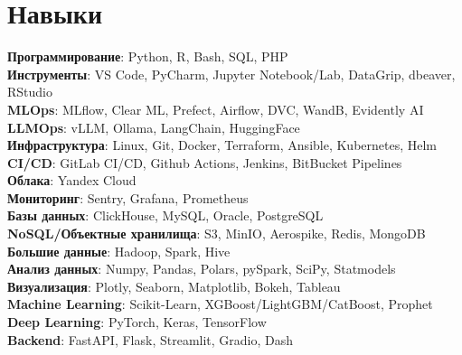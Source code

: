 \section{Навыки}
\begin{itemize}[leftmargin=0.15in, label={}]
  {\item{
        \textbf{Программирование}{: Python, R, Bash, SQL, PHP} \\
        \textbf{Инструменты}{: VS Code, PyCharm, Jupyter Notebook/Lab, DataGrip, dbeaver, RStudio} \\
        \textbf{MLOps}{: MLflow, Clear ML, Prefect, Airflow, DVC, WandB, Evidently AI} \\
        \textbf{LLMOps}{: vLLM, Ollama, LangChain, HuggingFace} \\
        \textbf{Инфраструктура}{: Linux, Git, Docker, Terraform, Ansible, Kubernetes, Helm} \\
        \textbf{CI/CD}{: GitLab CI/CD, Github Actions, Jenkins, BitBucket Pipelines} \\
        \textbf{Облака}{: Yandex Cloud} \\
        \textbf{Мониторинг}{: Sentry, Grafana, Prometheus} \\
        \textbf{Базы данных}{: ClickHouse, MySQL, Oracle, PostgreSQL} \\
        \textbf{NoSQL/Объектные хранилища}{: S3, MinIO, Aerospike, Redis, MongoDB} \\
        \textbf{Большие данные}{: Hadoop, Spark, Hive} \\
        \textbf{Анализ данных}{: Numpy, Pandas, Polars, pySpark, SciPy, Statmodels} \\
        \textbf{Визуализация}{: Plotly, Seaborn, Matplotlib, Bokeh, Tableau} \\
        \textbf{Machine Learning}{: Scikit-Learn, XGBoost/LightGBM/CatBoost, Prophet} \\
        \textbf{Deep Learning}{: PyTorch, Keras, TensorFlow} \\
        \textbf{Backend}{: FastAPI, Flask, Streamlit, Gradio, Dash} \\
        }}
\end{itemize}